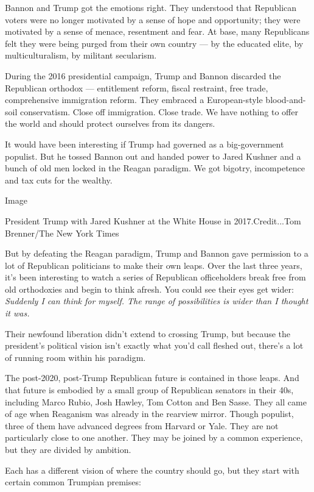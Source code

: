 Bannon and Trump got the emotions right. They understood that Republican
voters were no longer motivated by a sense of hope and opportunity; they
were motivated by a sense of menace, resentment and fear. At base, many
Republicans felt they were being purged from their own country --- by
the educated elite, by multiculturalism, by militant secularism.

During the 2016 presidential campaign, Trump and Bannon discarded the
Republican orthodox --- entitlement reform, fiscal restraint, free
trade, comprehensive immigration reform. They embraced a European-style
blood-and-soil conservatism. Close off immigration. Close trade. We have
nothing to offer the world and should protect ourselves from its
dangers.

It would have been interesting if Trump had governed as a big-government
populist. But he tossed Bannon out and handed power to Jared Kushner and
a bunch of old men locked in the Reagan paradigm. We got bigotry,
incompetence and tax cuts for the wealthy.

Image

President Trump with Jared Kushner at the White House in
2017.Credit...Tom Brenner/The New York Times

But by defeating the Reagan paradigm, Trump and Bannon gave permission
to a lot of Republican politicians to make their own leaps. Over the
last three years, it's been interesting to watch a series of Republican
officeholders break free from old orthodoxies and begin to think afresh.
You could see their eyes get wider: \emph{Suddenly I can think for
myself. The range of possibilities is wider than I thought it was.}

Their newfound liberation didn't extend to crossing Trump, but because
the president's political vision isn't exactly what you'd call fleshed
out, there's a lot of running room within his paradigm.

The post-2020, post-Trump Republican future is contained in those leaps.
And that future is embodied by a small group of Republican senators in
their 40s, including Marco Rubio, Josh Hawley, Tom Cotton and Ben Sasse.
They all came of age when Reaganism was already in the rearview mirror.
Though populist, three of them have advanced degrees from Harvard or
Yale. They are not particularly close to one another. They may be joined
by a common experience, but they are divided by ambition.

Each has a different vision of where the country should go, but they
start with certain common Trumpian premises:

